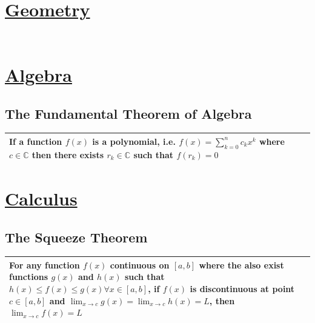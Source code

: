\documentclass[12pt]{article}
\begin{document}
\begin{center}
    
\section*{\textbf{\underline{Geometry}}}
\subsection*{\textbf{}}
\begin{tabular}{ | p{\textwidth} |}
    \hline
    
    \\ \hline
\end{tabular}


\section*{\textbf{\underline{Algebra}}}
\subsection*{\textbf{The Fundamental Theorem of Algebra}}
\begin{tabular}{ | p{\textwidth} |}
    \hline
    If a function \( f(x) \) is a polynomial, i.e. \( f(x) = \displaystyle\sum_{k=0}^{n} {c_k x^k} \) where \( c \in \mathbb{C} \) then there exists \( r_k \in \mathbb{C}\)
    such that \( f(r_k) = 0 \)
    \\ \hline
\end{tabular}


\section*{\textbf{\underline{Calculus}}}
\subsection*{\textbf{The Squeeze Theorem}}
\begin{tabular}{ | p{\textwidth} |}
    \hline
    For any function \( f(x) \) continuous on \( [a, b] \) where the also exist functions \( g(x) \) and \( h(x) \) such that \( h(x) \le f(x) \le g(x) \forall x \in [a, b] \),
    if \( f(x) \) is discontinuous at point \( c \in [a, b] \) and \( \displaystyle\lim_{x \rightarrow{c}} {g(x)} = \displaystyle\lim_{x \rightarrow{c}} {h(x)} = L \),
    then \( \displaystyle\lim_{x \rightarrow{c}} {f(x)} = L \)
    \\ \hline
\end{tabular} 


\end{center}
\end{document}
